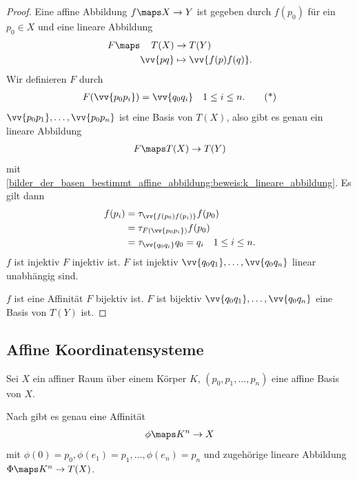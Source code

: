 \begin{proof}
    Eine affine Abbildung \( f\maps X\to Y \) ist gegeben durch \( f(p_0) \) für ein \( p_0\in X \) und eine lineare Abbildung
    \begin{align*}
        F\maps \begin{aligned}[t]
            T(X)&\to T(Y)\\
            \vv{pq}&\mapsto \vv{f(p)f(q)}.
        \end{aligned}
    \end{align*}
    Wir definieren \( F \) durch
    \begin{align*}
        F(\vv{p_0 p_i})=\vv{q_0 q_i}\quad 1\leq i \leq n. \tag{*}\label{bilder_der_basen_bestimmt_affine_abbildung:beweis:k_lineare_abbildung}
    \end{align*}
    \( \vv{p_0 p_1}, \dotsc, \vv{p_0 p_n} \) ist eine Basis von \( T(X) \), also gibt es genau ein lineare Abbildung
    \begin{align*}
        F\maps T(X)\to T(Y)
    \end{align*}
    mit \eqref{bilder_der_basen_bestimmt_affine_abbildung:beweis:k_lineare_abbildung}. Es gilt dann
    \begin{align*}
        f(p_i)\begin{aligned}[t]
            &=\tau_{\vv{f(p_0) f(p_i)}} f(p_0)\\
            &=\tau_{F(\vv{p_0 p_i})} f(p_0)\\
            &=\tau_{\vv{q_0 q_i}} q_0 =q_i \quad 1\leq i \leq n.
        \end{aligned}
    \end{align*}
    \( f \) ist injektiv \gdw \( F \) injektiv ist. \( F \) ist injektiv \gdw \( \vv{q_0 q_1}, \dotsc, \vv{q_0 q_n} \) linear unabhängig sind.

    \tto \( f \) ist eine Affinität \gdw \( F \) bijektiv ist. \( F \) ist bijektiv \gdw \( \vv{q_0 q_1}, \dotsc, \vv{q_0 q_n} \) eine Basis von \( T(Y) \) ist.

\end{proof}
\subsection*{Affine Koordinatensysteme}
Sei \( X \) ein affiner Raum über einem Körper \( K \), \( (p_0,p_1,\dotsc, p_n) \) eine affine Basis von \( X \).

Nach  gibt es genau eine Affinität
\begin{align*}
    \phi\maps K^n\to X
\end{align*}
mit \( \phi(0)=p_0, \phi(e_1)=p_1,\dotsc, \phi(e_n)=p_n \) und zugehörige lineare Abbildung \( \Phi\maps K^n \to T(X) \).

